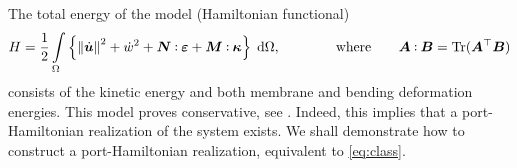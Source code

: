 \documentclass{ifacconf}
\DeclareMathOperator{\Tr}{Tr}
\newcommand*{\norm}[1]{\ensuremath{\left\|#1\right\|}}
\newcommand{\where}{\qquad \text{where} \qquad}
\def\onedot{$\mathsurround0pt\ldotp$}
\def\cddot{%
	\mathbin{\vcenter{\baselineskip.67ex
			\hbox{\onedot}\hbox{\onedot}}%
}}
\begin{document}
\begin{comment}
Its inverse is given by 
\begin{equation}
\bm{\Phi}^{-1}(\bm{A}) = \frac{1}{1 - \nu} \bm{A} - \frac{\nu}{1 - \nu^2} \Tr(\bm{A}) \bm{1}.
\end{equation}
\end{comment}

The total energy of the model (Hamiltonian functional)
\begin{equation}
	H = \frac{1}{2} \int_{\Omega}\left\{ \norm{\dot{\bm{u}}}^2 + \dot{w}^2 + \bm{N} \cddot \bm{\varepsilon} + \bm{M} \cddot \bm{\kappa} \right\} \d\Omega, \qquad \where \bm{A} \cddot \bm{B} = \Tr(\bm{A}^\top\bm{B})
\end{equation}
consists of the kinetic energy and both membrane and bending deformation energies.
This model proves conservative, see \cite{bilbao2015conservative}. Indeed, this implies that a port-Hamiltonian realization of the system exists. We shall demonstrate how to construct a port-Hamiltonian realization, equivalent to \eqref{eq:class}.
\end{document}

